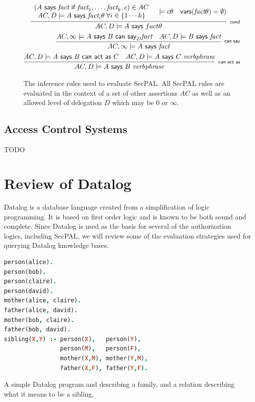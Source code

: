 \documentclass[a4paper,sfsidenotes]{tufte-book}
\begin{document}
\begin{figure}\label{secpal:rules}
  \centering
  \begin{eqnarray*}
    \infer[\textsf{\scriptsize cond}]{%
      AC, D \models A\textsf{~says~}fact\theta
    }{%
      \begin{array}[c]{c}
        \left(A\textsf{~says~}\textit{fact}\textsf{~if~}\textit{fact}_1, \ldots, \textit{fact}_k, c\right) \in AC \\
        AC,D\models A\textsf{~says~}\textit{fact}_i\theta \; \forall i \in \{1\cdots k\}
      \end{array}
      & \models{c\theta}
      & \textsf{vars}(\textit{fact}\theta) = \emptyset)
    }\\
    \infer[\textsf{\scriptsize can say}]{%
      AC, \infty \models A\textsf{~says~}\textit{fact}
    }{%
      AC, \infty \models A\textsf{~says~}B\textsf{~can~say}_D \textit{fact}
      & AC, D \models B\textsf{~says~}\textit{fact}
    } \\
    \infer[\textsf{\scriptsize can act as}]{%
      AC, D \models A\textsf{~says~}B~\textit{verbphrase}
    }{%
      AC, D \models A\textsf{~says~}B\textsf{~can~act~as~}C
      & AC, D \models A\textsf{~says~}C~\textit{verbphrase}
    }
  \end{eqnarray*}
  \caption{The inference rules used to evaluate {SecPAL}. All {SecPAL} rules are
  evaluated in the context of a set of other assertions $AC$ as well as an
  allowed level of delegation $D$ which may be $0$ or $\infty$.}
\end{figure}

\subsection{Access Control Systems}


{\Huge TODO}

\section{Review of Datalog}

Datalog is a database language created from a simplification of logic
programming.  It is based on first order logic and is known to be both sound and
complete.  Since Datalog is used as the basis for several of the authorization
logics, including SecPAL, we will review some of the evaluation strategies used
for querying Datalog knowledge bases.

\begin{marginfigure}
  \label{datalog:example}
  \begin{lstlisting}[language=Prolog]
person(alice).  
person(bob).
person(claire). 
person(david).
mother(alice, claire).
father(alice, david).
mother(bob, claire).
father(bob, david).
sibling(X,Y) :- person(X),   person(Y),
                person(M),   person(F),
                mother(X,M), mother(Y,M), 
                father(X,F), father(Y,F).
  \end{lstlisting}
  \caption{A simple Datalog program and describing a family, and a relation
  describing what it means to be a sibling.}
\end{marginfigure}
\end{document}
